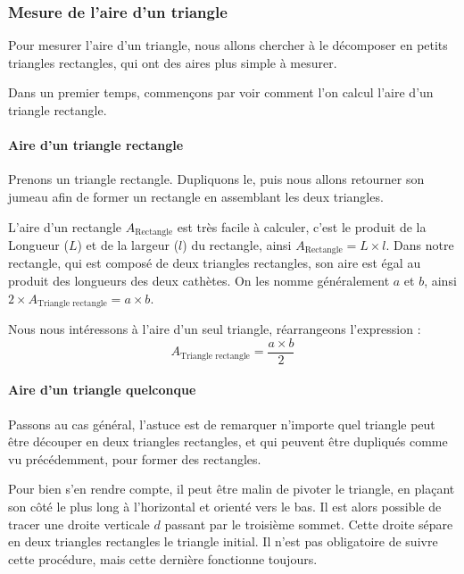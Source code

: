 \documentclass[a4paper, twoside]{article}
\begin{document}
\subsubsection{Mesure de l'aire d'un triangle}

Pour mesurer l'aire d'un triangle, nous allons chercher à le décomposer
en petits triangles rectangles, qui ont des aires plus simple à mesurer.

Dans un premier temps, commençons par voir comment l'on
calcul l'aire d'un triangle rectangle.

\paragraph*{Aire d'un triangle rectangle}

Prenons un triangle rectangle.
Dupliquons le, puis nous allons retourner
son jumeau afin de former un rectangle en assemblant les deux triangles.

L'aire d'un rectangle $A_{\text{Rectangle}}$ est très facile à calculer,
c'est le produit de la Longueur ($L$) et de la largeur ($l$) du rectangle,
ainsi $A_{\text{Rectangle}} = L \times l$.
Dans notre rectangle, qui est composé de deux triangles rectangles,
son aire est égal au produit des longueurs des deux cathètes.
On les nomme généralement $a$ et $b$, ainsi $2 \times A_{\text{Triangle rectangle}} = a \times b$.

Nous nous intéressons à l'aire d'un seul triangle,
réarrangeons l'expression : $$ A_{\text{Triangle rectangle}} = \frac{a \times b}{2} $$

\paragraph*{Aire d'un triangle quelconque}

Passons au cas général, l'astuce est de remarquer n'importe quel triangle
peut être découper en deux triangles rectangles,
et qui peuvent être dupliqués comme vu précédemment, pour former des rectangles.

Pour bien s'en rendre compte,
il peut être malin de pivoter le triangle,
en plaçant son côté le plus long à l'horizontal et orienté vers le bas.
Il est alors possible de tracer une droite verticale $d$ passant par le troisième sommet.
Cette droite sépare en deux triangles rectangles le triangle initial.
Il n'est pas obligatoire de suivre cette procédure,
mais cette dernière fonctionne toujours.

\medbreak
\end{document}
